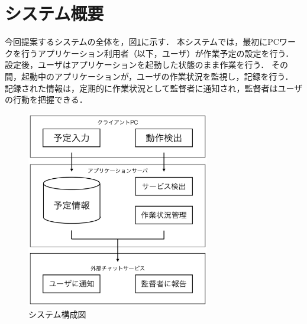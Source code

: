 \section{システム概要}
今回提案するシステムの全体を，図\ref{fig:structure_chart}に示す．
本システムでは，最初にPCワークを行うアプリケーション利用者（以下，ユーザ）が作業予定の設定を行う．
設定後，ユーザはアプリケーションを起動した状態のまま作業を行う．
その間，起動中のアプリケーションが，ユーザの作業状況を監視し，記録を行う．
記録された情報は，定期的に作業状況として監督者に通知され，監督者はユーザの行動を把握できる．

\begin{figure}[h]
  \begin{center}
  \includegraphics[width=8.0cm]{../graphics/structure_chart.png}
  \caption{システム構成図}
  \label{fig:structure_chart}
  \end{center}
\end{figure}

